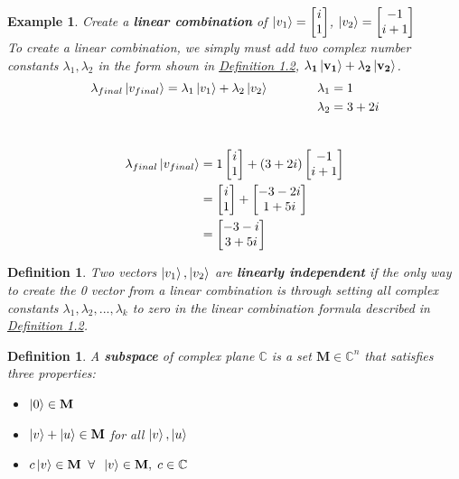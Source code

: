 \documentclass[12pt]{article}
\theoremstyle{plain}
\theoremstyle{nonumberplain}
\theoremstyle{plain}
\newtheorem{definition}[lemma]{Definition}
\newtheorem{example}[lemma]{Example}
\theoremstyle{nonumberplain}
\newcommand\1{{\bf 1}}
\newcommand{\bmat}[1]{\begin{bmatrix*} #1 \end{bmatrix*}} %
\newcommand{\C}{\mathbb{C}} %
\newcommand{\<}{\left\langle}
\renewcommand{\>}{\right\rangle}
\begin{document}
\begin{example}
Create a \textbf{linear combination} of $\ket{v_1} = \bmat{i\\1}$, $\ket{v_2} = \bmat{-1\\i + 1}$\\
To create a linear combination, we simply must add two complex number constants $\lambda_1, \lambda_2$ in the form shown in  \hyperref[def:Combination]{Definition 1.2}, $\mathbf{\lambda_1\ket{v_1} + \lambda_2\ket{v_2}}$. \\
\begin{equation*} 
\begin{split}
\lambda_{final}\ket{v_{final}} = \lambda_1\ket{v_1} + \lambda_2\ket{v_2} \qquad\qquad    
&\lambda_1 = 1\\
&\lambda_2 = 3 + 2i
\end{split}
\end{equation*}\\

\begin{equation}
\begin{split}
\lambda_{final}\ket{v_{final}} & = 1\bmat{i\\ 1} + (3 + 2i) \bmat{-1\\ i + 1}\\
& = \bmat{i\\ 1} + \bmat{-3 - 2i\\ 1 + 5i}\\
& = \bmat{-3 - i\\ 3 + 5i}
\end{split} 
\end{equation}
\end{example}

\begin{definition}
\label{def:Independence}
Two vectors $\ket{v_1}, \ket{v_2}$ are \textbf{linearly independent} if the only way to create the 0 vector from a linear combination is through setting all complex constants $\lambda_1, \lambda_2, ... , \lambda_k$ to zero in the linear combination formula described in \hyperref[def:Combination]{Definition 1.2}.
\end{definition}

\begin{definition}
A \textbf{subspace} of complex plane $\C$ is a set $\mathbf{M} \in \C^n$ that satisfies three properties:
\begin{itemize}
\item $\ket{0} \in \mathbf{M}$
\item $\ket{v} + \ket{u} \in  \mathbf{M}$ for all $\ket{v}, \ket{u}$
\item $c\ket{v} \in \mathbf{M}\;\; \forall\;\; \ket{v} \in \mathbf{M},\; c \in \C$
\end{itemize}   
\end{definition}
\end{document}
